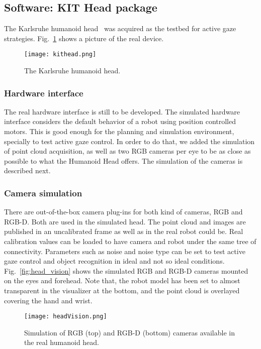 \subsection{Software: KIT Head package}
\label{sec:kithead}

The Karlsruhe humanoid head~\cite{Asfour2008KITHead} was acquired as the testbed for active gaze strategies. Fig.~\ref{fig:kit_head} shows a picture of the real device.

\begin{figure}
\centering
\texttt{[image: kithead.png]}
\caption{The Karlsruhe humanoid head.}
\label{fig:kit_head}
\end{figure}

\subsubsection{Hardware interface}

The real hardware interface is still to be developed. The simulated hardware interface considers the default behavior of a robot using position controlled motors. This is good enough for the planning and simulation environment, specially to test active gaze control. In order to do that, we added the simulation of point cloud acquisition, as well as two RGB cameras per eye to be as close as possible to what the Humanoid Head offers. The simulation of the cameras is described next.

\subsubsection{Camera simulation}
There are out-of-the-box camera plug-ins for both kind of cameras, RGB and RGB-D. Both are used in the simulated head. The point cloud and images are published in an uncalibrated frame as well as in the real robot could be. Real calibration values can be loaded to have camera and robot  under the same tree of connectivity. Parameters such as noise and noise type can be set to test active gaze control and object recognition in ideal and not so ideal conditions. Fig.~\ref{fig:head_vision} shows the simulated RGB and RGB-D cameras mounted on the eyes and forehead. Note that, the robot model has been set to almost transparent in the visualizer at the bottom, and the point cloud is overlayed covering the hand and wrist.

\begin{figure}[h!]
\centering
\texttt{[image: headVision.png]}
\caption{Simulation of RGB (top) and RGB-D (bottom) cameras available in the real humanoid head.}
\label{fig:kit_vision}
\end{figure}